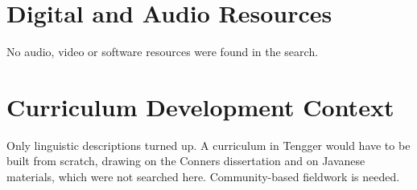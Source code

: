 \documentclass[12pt]{article}
\begin{document}
\section{Digital and Audio Resources}
No audio, video or software resources were found in the search.

\section{Curriculum Development Context}
Only linguistic descriptions turned up. A curriculum in Tengger would have to be built from scratch, drawing on the Conners dissertation and on Javanese materials, which were not searched here. Community-based fieldwork is needed.
\end{document}
